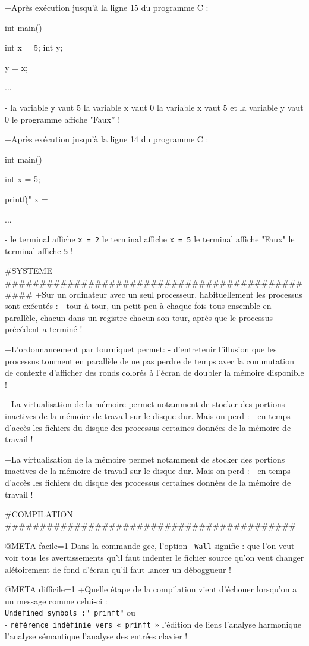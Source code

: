 +Après exécution jusqu'à la ligne 15 du programme  C :
\begin{listing}{10}
int main() {
    int x = 5;
    int y;

    y = x;

    ...
}
\end{listing}
-
 la variable y vaut $5$
 la variable x vaut $0$
 la variable x vaut $5$ et la variable y vaut $0$
 le programme affiche "Faux''
!

+Après exécution jusqu'à la ligne 14 du programme  C :
\begin{listing}{10}
int main() {
    int x = 5;

    printf(" x  = %

    ...
}
\end{listing}
-
 le terminal affiche \verb+x = 2+
 le terminal affiche \verb+x = 5+
 le terminal affiche "Faux"
 le terminal affiche \verb+5+
!

#SYSTEME ###############################################
+Sur un ordinateur avec un seul processeur, habituellement les processus sont
exécutés :
-
 tour à tour, un petit peu à chaque fois
 tous ensemble
 en parallèle, chacun dans un registre
 chacun son tour, après que le processus précédent a terminé
!

+L'ordonnancement par tourniquet permet:
-
 d'entretenir l'illusion que les processus tournent en parallèle
 de ne pas perdre de temps avec la commutation de contexte
 d'afficher des ronds colorés à l'écran
 de doubler la mémoire disponible
!

+La virtualisation de la mémoire permet notamment de stocker des portions inactives de la
mémoire de travail sur le disque dur. Mais on perd :
-
 en temps d'accès
 les fichiers du disque
 des processus
 certaines données de la mémoire de travail
!

+La virtualisation de la mémoire permet notamment de stocker des portions inactives de la
mémoire de travail sur le disque dur. Mais on perd :
-
 en temps d'accès
 les fichiers du disque
 des processus
 certaines données de la mémoire de travail
!


#COMPILATION ##########################################

@META facile=1
Dans la commande gcc, l'option \verb|-Wall| signifie :
 que l'on veut voir tous les avertissements
 qu'il faut indenter le fichier source
 qu'on veut changer alétoirement de fond d'écran
 qu'il faut lancer un déboggueur
!

@META difficile=1
+Quelle étape de la compilation vient d'échouer lorsqu'on a un message
 comme celui-ci : \\
 \verb+Undefined symbols :"_prinft"+ ou \\
- \verb+référence indéfinie vers « prinft »+
 l'édition de liens
 l'analyse harmonique
 l'analyse sémantique
 l'analyse des entrées clavier
!

